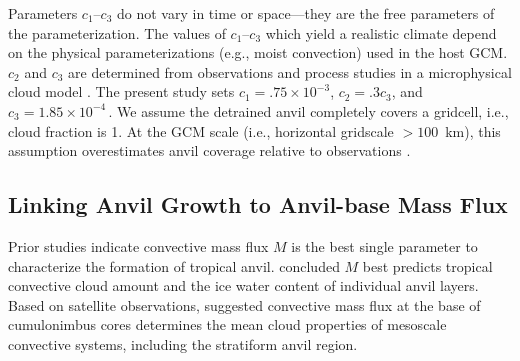 \documentclass[twoside,agupp]{aguplus}
\begin{document}
Parameters $c_1$--$c_3$ do not vary in time or space---they are the
free parameters of the parameterization.
The values of $c_1$--$c_3$ which yield a realistic climate depend on
the physical parameterizations (e.g., moist convection) used in the
host GCM.  
$c_2$ and $c_3$ are determined from observations \cite[]{LeH80,GaH83}
and process studies in a microphysical cloud model \cite[]{ZeK941}.
The present study sets $c_1 = .75 \times 10^{-3}$, $c_2 = .3 c_3$, and
$c_3 = 1.85 \times 10^{-4}$\,\xs.
We assume the detrained anvil completely covers a gridcell, i.e.,
cloud fraction is 1. 
At the GCM scale (i.e., horizontal gridscale $> 100$~km), this
assumption overestimates anvil coverage relative to observations
\cite{LeH80,Hou89,MaH93}.  

\subsection{Linking Anvil Growth to Anvil-base Mass Flux}\label{sec:mc}

Prior studies indicate convective mass flux $M$ is the best single
parameter to characterize the formation of tropical anvil. 
\cite{XuK91} concluded $M$ best predicts tropical convective cloud
amount and the ice water content of individual anvil layers.   
Based on satellite observations, \cite{MaR93} suggested convective
mass flux at the base of cumulonimbus cores determines the mean cloud 
properties of mesoscale convective systems, including the stratiform
anvil region.
\end{document}

